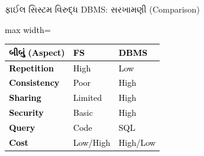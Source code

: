 \documentclass[aspectratio=169, 10pt]{beamer}
\begin{document}
\begin{frame}{ફાઈલ સિસ્ટમ વિરુદ્ધ DBMS: સરખામણી (Comparison)}
    \begin{center}
        \textcolor{black}{
        \begin{adjustbox}{max width=\textwidth}
        \begin{tabular}{|l|l|l|}
        \hline
        \textbf{બીબું (Aspect)} & \textbf{FS} & \textbf{DBMS} \\ \hline
        \textbf{Repetition} & High & Low \\ \hline
        \textbf{Consistency} & Poor & High \\ \hline
        \textbf{Sharing} & Limited & High \\ \hline
        \textbf{Security} & Basic & High \\ \hline
        \textbf{Query} & Code & SQL \\ \hline
        \textbf{Cost} & Low/High & High/Low \\ \hline
        \end{tabular}
        \end{adjustbox}
        }
    \end{center}
\note{
}
\end{frame}
\end{document}
